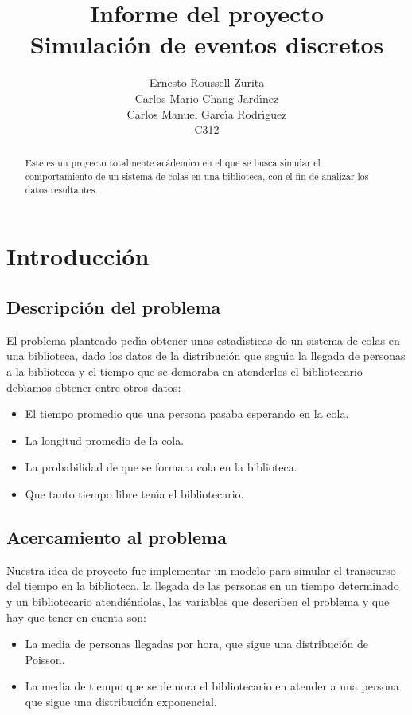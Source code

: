 \documentclass{article}
\title{Informe del proyecto \\ Simulaci\'on de eventos discretos}
\author{Ernesto Roussell Zurita \\Carlos Mario Chang Jard\'{\i}nez\\ Carlos Manuel Garc\'{\i}a Rodr\'{\i}guez \\ C312}
\begin{document}
\maketitle
\begin{abstract}
    Este es un proyecto totalmente ac\'ademico en el que se busca simular el comportamiento de un sistema de colas en una biblioteca,
    con el fin de analizar los datos resultantes. 
\end{abstract}

\newpage

\section{Introducci\'on}
    \subsection*{Descripci\'on del problema}
    El problema planteado ped\'{\i}a obtener unas estad\'{\i}sticas de un sistema de colas en una biblioteca,
    dado los datos de la distribuci\'on que segu\'{\i}a la llegada de personas a la biblioteca y el tiempo que
    se demoraba en atenderlos el bibliotecario deb\'{\i}amos obtener entre otros datos:
    \begin{itemize}
        \item El tiempo promedio que una persona pasaba esperando en la cola.
        \item La longitud promedio de la cola.
        \item La probabilidad de que se formara cola en la biblioteca.
        \item Que tanto tiempo libre ten\'{\i}a el bibliotecario.
    \end{itemize} 

    \subsection*{Acercamiento al problema}
    Nuestra idea de proyecto fue implementar un modelo para simular el transcurso del tiempo
    en la biblioteca, la llegada de las personas en un tiempo determinado y un bibliotecario 
    atendi\'endolas, las variables que describen el problema y que hay que tener en cuenta son:
    \begin{itemize}
        \item La media de personas llegadas por hora, que sigue una distribuci\'on de Poisson.
        \item La media de tiempo que se demora el bibliotecario en atender a una persona que sigue una distribuci\'on exponencial.
    \end{itemize}   
\end{document}
